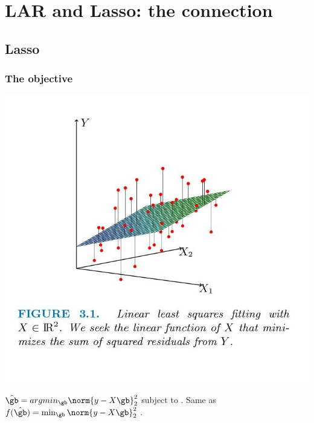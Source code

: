 \documentclass{beamer}
\begin{document}
\section{LAR and Lasso: the connection}
\subsection{Lasso}
\begin{frame}
\frametitle{The objective}
\includegraphics[scale=0.25]{images/figures3-0.jpg}
\begin{itemize}
\pitem $\hat{\gb} = argmin_{\gb} \norm{y-X\gb}_{2}^{2}$ subject to .
\pitem Same as $f(\hat{\gb}) = \min_{\gb} \norm{y-X\gb}_{2}^{2}$ .
\end{itemize}
\end{frame}
\end{document}
